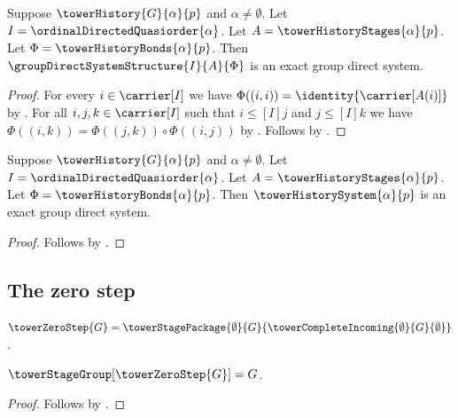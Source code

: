 \begin{theorem}\label{tower_history_system_constructed}
    Suppose $\towerHistory{G}{\alpha}{p}$ and
        $\alpha\neq\emptyset$.
    Let $I=\ordinalDirectedQuasiorder{\alpha}$.
    Let $A=\towerHistoryStages{\alpha}{p}$.
    Let $\Phi=\towerHistoryBonds{\alpha}{p}$.
    Then $\groupDirectSystemStructure{I}{A}{\Phi}$ is an exact
        group direct system.
\end{theorem}
\begin{proof}
    For every $i\in\carrier[I]$ we have
        $\Phi((i,i))=\identity{\carrier[A(i)]}$ by
        .
    For all $i,j,k\in\carrier[I]$ such that
        $i\mathrel{\leq[I]}j$ and $j\mathrel{\leq[I]}k$ we have
        $\Phi((i,k))=\Phi((j,k))\circ\Phi((i,j))$ by
        .
    Follows by .
\end{proof}

\begin{corollary}\label{tower_history_system_is_system}
    Suppose $\towerHistory{G}{\alpha}{p}$ and
        $\alpha\neq\emptyset$.
    Let $I=\ordinalDirectedQuasiorder{\alpha}$.
    Let $A=\towerHistoryStages{\alpha}{p}$.
    Let $\Phi=\towerHistoryBonds{\alpha}{p}$.
    Then $\towerHistorySystem{\alpha}{p}$ is an exact
        group direct system.
\end{corollary}
\begin{proof}
    Follows by .
\end{proof}

\subsection{The zero step}

\begin{definition}\label{tower_zero_step}
    $\towerZeroStep{G}=
        \towerStagePackage{\emptyset}{G}{
            \towerCompleteIncoming{\emptyset}{G}{\emptyset}}$.
\end{definition}

\begin{proposition}\label{tower_zero_step_group}
    $\towerStageGroup[\towerZeroStep{G}]=G$.
\end{proposition}
\begin{proof}
    Follows by
        .
\end{proof}

